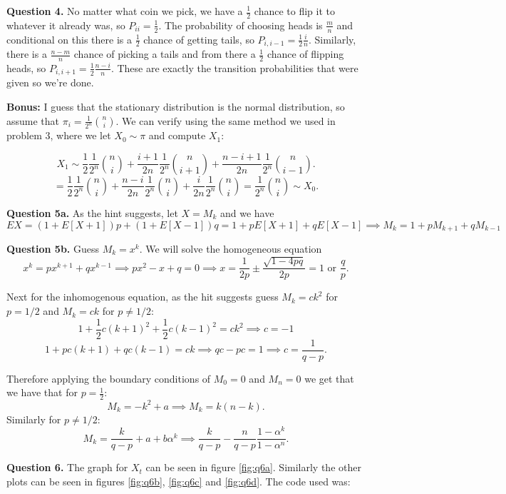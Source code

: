 \documentclass[letterpaper, reqno,11pt]{article}
\begin{document}
{\medskip\noindent\bf Question 4.} No matter what coin we pick, we have a $\frac{1}{2}$ chance to flip it to whatever it already was, so $P_{ii}=\frac{1}{2}$. The probability of choosing heads is $\frac{m}{n}$ and conditional on this there is a $\frac{1}{2} $ chance of getting tails, so $P_{i,i-1}=\frac{1}{2}\frac{i}{n}$. Similarly, there is a $\frac{n-m}{n}$ chance of picking a tails and from there a $\frac{1}{2}$ chance of flipping heads, so $P_{i,i+1}=\frac{1}{2}\frac{n-i}{n}$. These are exactly the transition probabilities that were given so we're done. 

{\noindent\bf Bonus:} I guess that the stationary distribution is the normal distribution, so assume that $\pi_i=\frac{1}{2^{n}}{n\choose i}$. We can verify using the same method we used in problem 3, where we let $X_0\sim \pi$ and compute $X_1$: 

\[
    X_1\sim \frac{1}{2}\frac{1}{2^{n}}{n\choose i}+\frac{i+1}{2n}\frac{1}{2^{n}}{n\choose i+1}+\frac{n-i+1}{2n}\frac{1}{2^{n}}{n\choose i-1}
.\]
\[
    =\frac{1}{2}\frac{1}{2^{n}}{n\choose i}+\frac{n-i}{2n}\frac{1}{2^{n}}{n\choose i}+\frac{i}{2n}\frac{1}{2^{n}}{n\choose i}=\frac{1}{2^{n}}{n\choose i}\sim X_0
.\]


{\medskip\noindent\bf Question 5a.} As the hint suggests, let $X=M_k$ and we have
\[
    EX=(1+E[X+1])p+(1+E[X-1])q=1+pE[X+1]+qE[X-1]\implies M_k=1+pM_{k+1}+qM_{k-1}
\]

{\medskip\noindent\bf Question 5b.} Guess $M_k=x^{k}$. We will solve the homogeneous equation
\[
x^{k}=px^{k+1}+qx^{k-1}\implies px^2-x+q=0\implies x=\frac{1}{2p}\pm \frac{\sqrt{1-4pq} }{2p}=1\text{ or }\frac{q}{p}
.\]

Next for the inhomogenous equation, as the hit suggests guess $M_k=ck^2$ for $p=1 /2$ and $M_k=ck$ for $p\neq 1 /2$:
\[
1+\frac{1}{2}c(k+1)^2+\frac{1}{2}c(k-1)^2=ck^2\implies c=-1
\]
\[
1+pc(k+1)+qc(k-1)=ck \implies qc-pc=1\implies c=\frac{1}{q-p}
.\]

Therefore applying the boundary conditions of $M_0=0$ and $M_n=0$ we get that we have that for $p=\frac{1}{2}$:
\[
M_k=-k^2+a\implies M_k=k(n-k)
.\]
Similarly for $p\neq 1 /2$:
\[
M_k=\frac{k}{q-p}+a+b\alpha^{k}\implies \frac{k}{q-p}-\frac{n}{q-p}\frac{1-\alpha ^{k}}{1-\alpha ^{n}}
.\]

{\medskip\noindent\bf Question 6.} The graph for $X_t$ can be seen in figure \ref{fig:q6a}. Similarly the other plots can be seen in figures \ref{fig:q6b}, \ref{fig:q6c} and \ref{fig:q6d}. The code used was: 
\end{document}
